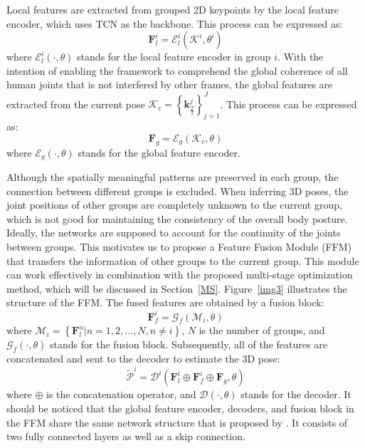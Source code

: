 \documentclass[sigconf]{acmart}
\begin{document}
Local features are extracted from grouped 2D keypoints by the local feature encoder, which uses TCN \cite{jllo20193d} as the backbone. This process can be expressed as:
\begin{equation}
\mathbf{F}_{l}^{i}={\mathcal{E}_{l}^{i}}(\mathcal{K}^{i}, \theta^{i})\label{eq}
\end{equation}
where ${\mathcal{E}_{l}^{i}}(\cdot, \theta)$ stands for the local feature encoder in group $i$. With the intention of enabling the framework to comprehend the global coherence of all human joints that is not interfered by other frames, the global features are extracted from the current pose $\mathcal{K}_{c}=\left\{\mathbf{k}^{j}_{\frac{T}{2}}\right\}_{j=1}^{J}$. This process can be expressed as:
\begin{equation}
\mathbf{F}_{g}={\mathcal{E}_{g}}(\mathcal{K}_{c}, \theta)
\end{equation}
where ${\mathcal{E}_{g}}(\cdot, \theta)$ stands for the global feature encoder.

Although the spatially meaningful patterns are preserved in each group, the connection between different groups is excluded. When inferring 3D poses, the joint positions of other groups are completely unknown to the current group, which is not good for maintaining the consistency of the overall body posture. Ideally, the networks are supposed to account for the continuity of the joints between groups. This motivates us to propose a Feature Fusion Module (FFM) that transfers the information of other groups to the current group. This module can work effectively in combination with the proposed multi-stage optimization method, which will be discussed in Section~\ref{MS}. Figure~\ref{img3} illustrates the structure of the FFM. The fused features are obtained by a fusion block:
\begin{equation}
\mathbf{F}_{f}^{i}={\mathcal{G}_{f}}(\mathcal{M}_{i}, \theta)
\end{equation}
where $\mathcal{M}_{i} = \left\{\mathbf{F}_{l}^{n}|n=1,2, \ldots, N, n \neq i\right\}$, $N$ is the number of groups, and ${\mathcal{G}_{f}}(\cdot, \theta)$ stands for the fusion block. Subsequently, all of the features are concatenated and sent to the decoder to estimate the 3D pose:
\begin{equation}
\tilde{\mathcal{P}}^{i}={\mathcal{D}^{i}}(\mathbf{F}_{l}^{i}\oplus\mathbf{F}_{f}^{i}\oplus\mathbf{F}_{g}, \theta)
\end{equation}
where $\oplus$ is the concatenation operator, and ${\mathcal{D}}(\cdot, \theta)$ stands for the decoder. It should be noticed that the global feature encoder, decoders, and fusion block in the FFM share the same network structure that is proposed by \cite{martinez2017simple}. It consists of two fully connected layers as well as a skip connection. 
\end{document}
